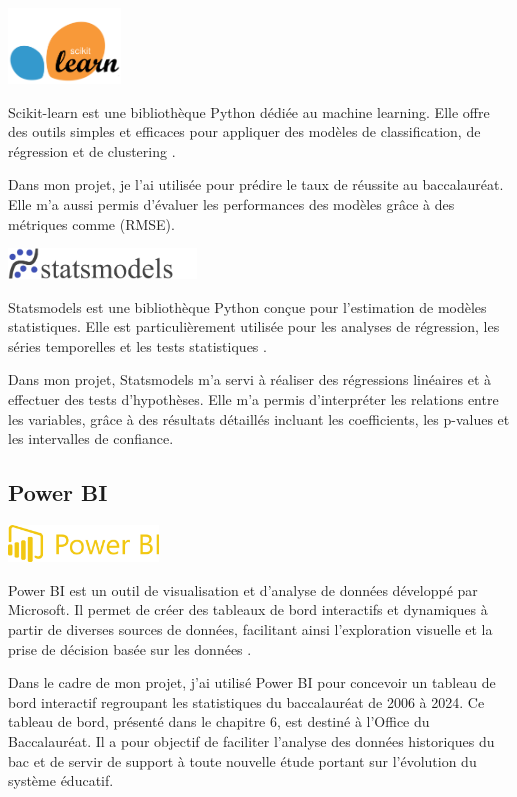 \newpage
\includegraphics[width=3cm]{images/sckitlearn.png}

Scikit-learn est une bibliothèque Python dédiée au machine learning. 
Elle offre des outils simples et efficaces pour appliquer des modèles de classification, de régression et de clustering \cite{scikitLearn}.

Dans mon projet, je l’ai utilisée pour prédire le taux de réussite au baccalauréat. 
Elle m’a aussi permis d’évaluer les performances des modèles grâce à des métriques comme (RMSE).

\includegraphics[width=5cm]{images/statsmodes.png}

Statsmodels est une bibliothèque Python conçue pour l’estimation de modèles statistiques. 
Elle est particulièrement utilisée pour les analyses de régression, les séries temporelles et les tests statistiques \cite{statsmodels}.

Dans mon projet, Statsmodels m’a servi à réaliser des régressions linéaires et à effectuer des tests d’hypothèses. 
Elle m’a permis d’interpréter les relations entre les variables, grâce à des résultats détaillés incluant les coefficients, 
les p-values et les intervalles de confiance.

\subsection{Power BI}

\includegraphics[width=4cm]{images/powerbi.png}

Power BI est un outil de visualisation et d’analyse de données développé par Microsoft. 
Il permet de créer des tableaux de bord interactifs et dynamiques à partir de diverses sources de données, 
facilitant ainsi l'exploration visuelle et la prise de décision basée sur les données \cite{powerBI}.

Dans le cadre de mon projet, j’ai utilisé Power BI pour concevoir un tableau de bord interactif regroupant les statistiques du baccalauréat de 2006 à 2024. 
Ce tableau de bord, présenté dans le chapitre 6, est destiné à l’Office du Baccalauréat. Il a pour objectif de faciliter l’analyse des données historiques du bac et de servir de support à toute nouvelle étude portant sur l’évolution du système éducatif.

